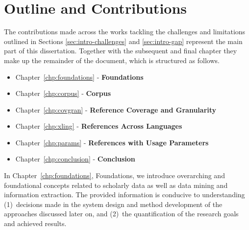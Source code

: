 



\section{Outline and Contributions}

The contributions made across the works tackling the challenges and limitations outlined in Sections \ref{sec:intro-challenges} and \ref{sec:intro-gap} represent the main part of this dissertation. Together with the subsequent and final chapter they make up the remainder of the document, which is structured as follows.

\begin{itemize}
    \item Chapter~\ref{chp:foundations} - \textbf{Foundations}
    \item Chapter~\ref{chp:corpus} - \textbf{Corpus}
    \item Chapter~\ref{chp:covgran} - \textbf{Reference Coverage and Granularity}
    \item Chapter~\ref{chp:xling} - \textbf{References Across Languages}
    \item Chapter~\ref{chp:params} - \textbf{References with Usage Parameters}
    \item Chapter~\ref{chp:conclusion} - \textbf{Conclusion}
\end{itemize}

In Chapter~\ref{chp:foundations}, Foundations, we introduce overarching and foundational concepts related to scholarly data as well as data mining and information extraction. The provided information is conducive to understanding (1)~decisions made in the system design and method development of the approaches discussed later on, and (2)~the quantification of the research goals and achieved results.

